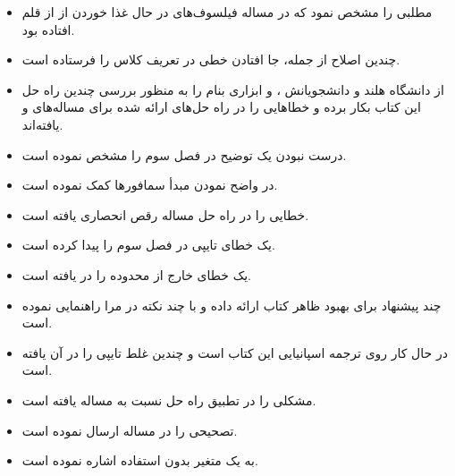 \documentclass{book}
\begin{document}
\begin{itemize}
\item {} 
    مطلبی را مشخص نمود که در مساله فیلسوف‌های در حال غذا خوردن از از قلم افتاده بود. 
    

\item {}
    چندین اصلاح از جمله، جا افتادن خطی در تعریف کلاس  را فرستاده است. 

\item {}
    از دانشگاه  هلند و دانشجویانش 
    ،  و 
    ابزاری بنام  را به منظور بررسی چندین راه حل این کتاب بکار برده و خطاهایی را در راه حل‌های ارائه شده برای 
    مساله‌های  و   یافته‌اند. 
    
\item {}
    درست نبودن یک توضیح در فصل سوم را مشخص نموده است. 


\item  {} 
    در واضح نمودن مبدأ سمافورها کمک نموده است. 

\item {} 
    خطایی را در راه حل مساله رقص انحصاری یافته است. 

\item {} یک خطای تایپی در فصل سوم را پیدا کرده است. 

\item {} 
    یک خطای خارج از محدوده را در  یافته است. 

\item {}
    چند پیشنهاد برای بهبود ظاهر کتاب ارائه داده و با چند نکته در \lr{\LaTeX} مرا راهنمایی نموده است. 
    
\item   {} 
    در حال کار روی ترجمه اسپانیایی این کتاب است و چندین غلط تایپی را در آن یافته است. 

\item {} 
    مشکلی را در تطبیق راه حل  نسبت به مساله  یافته است. 

\item {}
    تصحیحی را در مساله   ارسال نموده است. 
    
\item {}
    به یک متغیر بدون استفاده اشاره نموده است. 


\end{itemize}
\end{document}
